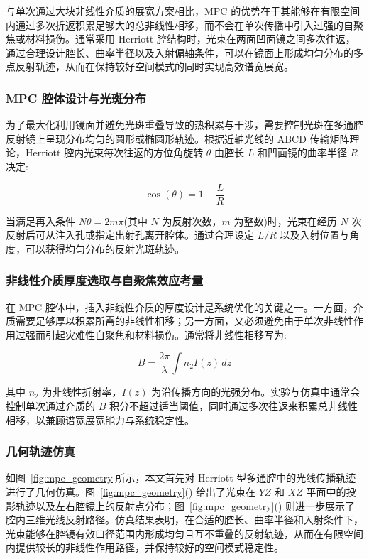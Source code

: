 与单次通过大块非线性介质的展宽方案相比，MPC 的优势在于其能够在有限空间内通过多次折返积累足够大的总非线性相移，而不会在单次传播中引入过强的自聚焦或材料损伤。通常采用 Herriott 腔结构时，光束在两面凹面镜之间多次往返，通过合理设计腔长、曲率半径以及入射偏轴条件，可以在镜面上形成均匀分布的多点反射轨迹，从而在保持较好空间模式的同时实现高效谱宽展宽。




\subsubsection{MPC 腔体设计与光斑分布}

为了最大化利用镜面并避免光斑重叠导致的热积累与干涉，需要控制光斑在多通腔反射镜上呈现分布均匀的圆形或椭圆形轨迹。根据近轴光线的 ABCD 传输矩阵理论，Herriott 腔内光束每次往返的方位角旋转 $\theta$ 由腔长 $L$ 和凹面镜的曲率半径 $R$ 决定:

\begin{equation}
    \cos(\theta) = 1 - \frac{L}{R}
\end{equation}

当满足再入条件 $N\theta = 2m\pi$(其中 $N$ 为反射次数，$m$ 为整数)时，光束在经历 $N$ 次反射后可从注入孔或指定出射孔离开腔体。通过合理设定 $L/R$ 以及入射位置与角度，可以获得均匀分布的反射光斑轨迹。



\subsubsection{非线性介质厚度选取与自聚焦效应考量}

在 MPC 腔体中，插入非线性介质的厚度设计是系统优化的关键之一。一方面，介质需要足够厚以积累所需的非线性相移；另一方面，又必须避免由于单次非线性作用过强而引起灾难性自聚焦和材料损伤。通常将非线性相移写为:

\begin{equation}
    B = \frac{2\pi}{\lambda}\int n_2 I(z)\,dz
\end{equation}

其中 $n_2$ 为非线性折射率，$I(z)$ 为沿传播方向的光强分布。实验与仿真中通常会控制单次通过介质的 $B$ 积分不超过适当阈值，同时通过多次往返来积累总非线性相移，以兼顾谱宽展宽能力与系统稳定性。



\subsubsection{几何轨迹仿真}
如图~\ref{fig:mpc_geometry}所示，本文首先对 Herriott 型多通腔中的光线传播轨迹进行了几何仿真。图~\ref{fig:mpc_geometry}() 给出了光束在 $YZ$ 和 $XZ$ 平面中的投影轨迹以及左右腔镜上的反射点分布；图~\ref{fig:mpc_geometry}() 则进一步展示了腔内三维光线反射路径。仿真结果表明，在合适的腔长、曲率半径和入射条件下，光束能够在腔镜有效口径范围内形成均匀且互不重叠的反射轨迹，从而在有限空间内提供较长的非线性作用路径，并保持较好的空间模式稳定性。

